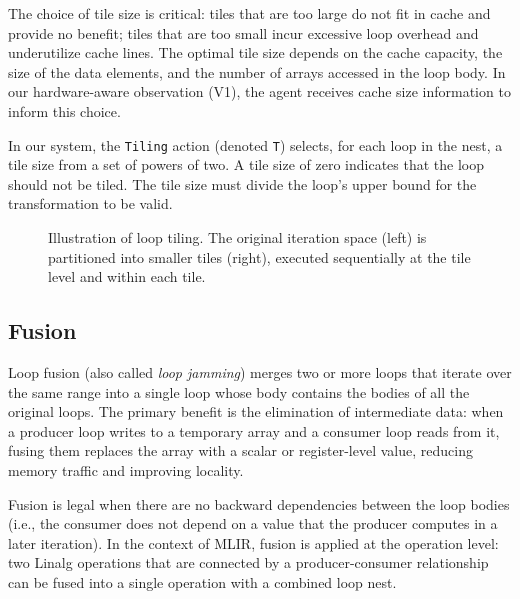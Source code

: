 The choice of tile size is critical: tiles that are too large do not fit in cache and provide no benefit; tiles that are too small incur excessive loop overhead and underutilize cache lines. The optimal tile size depends on the cache capacity, the size of the data elements, and the number of arrays accessed in the loop body. In our hardware-aware observation (V1), the agent receives cache size information to inform this choice.

In our system, the \texttt{Tiling} action (denoted \texttt{T}) selects, for each loop in the nest, a tile size from a set of powers of two. A tile size of zero indicates that the loop should not be tiled. The tile size must divide the loop's upper bound for the transformation to be valid.

\begin{figure}[H]
    \centering
    \caption{Illustration of loop tiling. The original iteration space (left) is partitioned into smaller tiles (right), executed sequentially at the tile level and within each tile.}
    \label{fig:loop-tiling}
\end{figure}

\subsection{Fusion}

Loop fusion (also called \textit{loop jamming}) merges two or more loops that iterate over the same range into a single loop whose body contains the bodies of all the original loops. The primary benefit is the elimination of intermediate data: when a producer loop writes to a temporary array and a consumer loop reads from it, fusing them replaces the array with a scalar or register-level value, reducing memory traffic and improving locality.

Fusion is legal when there are no backward dependencies between the loop bodies (i.e., the consumer does not depend on a value that the producer computes in a later iteration). In the context of MLIR, fusion is applied at the operation level: two Linalg operations that are connected by a producer-consumer relationship can be fused into a single operation with a combined loop nest.

